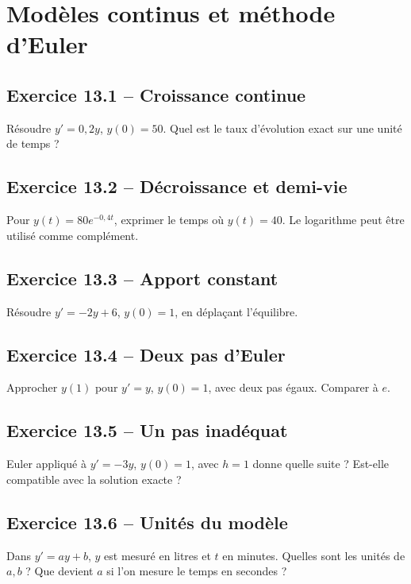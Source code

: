 \chapter{Modèles continus et méthode d'Euler}
\section*{Exercice 13.1 -- Croissance continue}
Résoudre $y'=0{,}2y$, $y(0)=50$. Quel est le taux d'évolution exact sur une unité de temps ?

\section*{Exercice 13.2 -- Décroissance et demi-vie}
Pour $y(t)=80e^{-0{,}4t}$, exprimer le temps où $y(t)=40$. Le logarithme peut être utilisé comme complément.

\section*{Exercice 13.3 -- Apport constant}
Résoudre $y'=-2y+6$, $y(0)=1$, en déplaçant l'équilibre.

\section*{Exercice 13.4 -- Deux pas d'Euler}
Approcher $y(1)$ pour $y'=y$, $y(0)=1$, avec deux pas égaux. Comparer à $e$.

\section*{Exercice 13.5 -- Un pas inadéquat}
Euler appliqué à $y'=-3y$, $y(0)=1$, avec $h=1$ donne quelle suite ? Est-elle compatible avec la solution exacte ?

\section*{Exercice 13.6 -- Unités du modèle}
Dans $y'=ay+b$, $y$ est mesuré en litres et $t$ en minutes. Quelles sont les unités de $a,b$ ? Que devient $a$ si l'on mesure le temps en secondes ?
